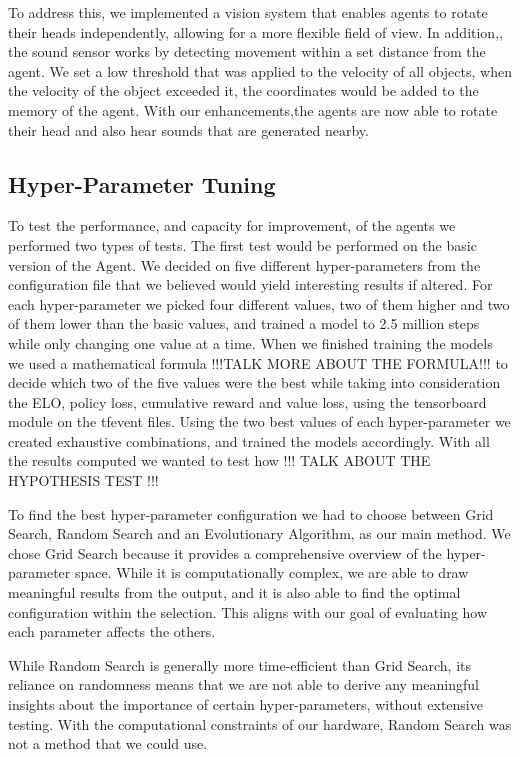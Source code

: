 \documentclass[a4paper,12pt]{article}
\begin{document}
To address this, we implemented a vision system that enables agents to rotate their heads independently, allowing for a more flexible field of view. In addition,, the sound sensor works by detecting movement within a set distance from the agent. We set a low threshold that was applied to the velocity of all objects, when the velocity of the object exceeded it, the coordinates would be added to the memory of the agent. With our enhancements,the agents are now able to rotate their head and also hear sounds that are generated nearby. 
\newpage
\subsection{Hyper-Parameter Tuning}
To test the performance, and capacity for improvement, of the agents we performed two types of tests. The first test would be performed on the basic version of the Agent. We decided on five different hyper-parameters from the configuration file that we believed would yield interesting results if altered. For each hyper-parameter we picked four different values, two of them higher and two of them lower than the basic values, and trained a model to 2.5 million steps while only changing one value at a time. When we finished training the models we used a mathematical formula !!!TALK MORE ABOUT THE FORMULA!!! to decide which two of the five values were the best while taking into consideration the ELO, policy loss, cumulative reward and value loss, using the tensorboard module on the tfevent files. Using the two best values of each hyper-parameter we created exhaustive combinations, and trained the models accordingly. With all the results computed we wanted to test how !!! TALK ABOUT THE HYPOTHESIS TEST !!!

To find the best hyper-parameter configuration we had to choose between Grid Search, Random Search and an Evolutionary Algorithm, as our main method. We chose Grid Search because it provides a comprehensive overview of the hyper-parameter space. While it is computationally complex, we are able to draw meaningful results from the output, and it is also able to find the optimal configuration within the selection. This aligns with our goal of evaluating how each parameter affects the others.

While Random Search is generally more time-efficient than Grid Search, its reliance on randomness means that we are not able to derive any meaningful insights about the importance of certain hyper-parameters, without  extensive testing. With the computational constraints of our hardware, Random Search was not a method that we could use. 
\end{document}
